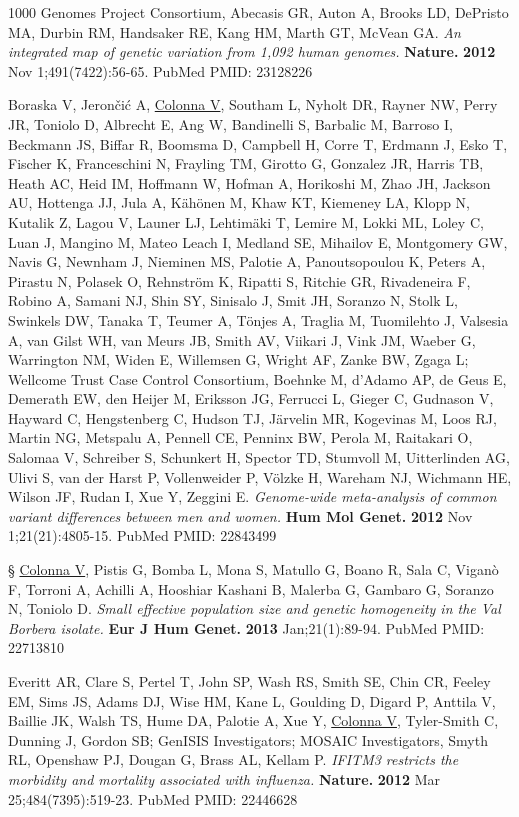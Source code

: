\documentclass[openany]{book}
\begin{document}
\begin{enumerate}
    \item 1000 Genomes Project Consortium, Abecasis GR, Auton A, Brooks LD, DePristo MA, Durbin RM, Handsaker RE, Kang HM, Marth GT, McVean GA. \textit{An integrated map of genetic variation from 1,092 human genomes.}\textbf{ Nature. } \textbf{2012} Nov 1;491(7422):56-65. PubMed PMID: 23128226

    \item Boraska V, Jerončić A, \underline{Colonna V}, Southam L, Nyholt DR, Rayner NW, Perry JR, Toniolo D, Albrecht E, Ang W, Bandinelli S, Barbalic M, Barroso I, Beckmann JS, Biffar R, Boomsma D, Campbell H, Corre T, Erdmann J, Esko T, Fischer K, Franceschini N, Frayling TM, Girotto G, Gonzalez JR, Harris TB, Heath AC, Heid IM, Hoffmann W, Hofman A, Horikoshi M, Zhao JH, Jackson AU, Hottenga JJ, Jula A, Kähönen M, Khaw KT, Kiemeney LA, Klopp N, Kutalik Z, Lagou V, Launer LJ, Lehtimäki T, Lemire M, Lokki ML, Loley C, Luan J, Mangino M, Mateo Leach I, Medland SE, Mihailov E, Montgomery GW, Navis G, Newnham J, Nieminen MS, Palotie A, Panoutsopoulou K, Peters A, Pirastu N, Polasek O, Rehnström K, Ripatti S, Ritchie GR, Rivadeneira F, Robino A, Samani NJ, Shin SY, Sinisalo J, Smit JH, Soranzo N, Stolk L, Swinkels DW, Tanaka T, Teumer A, Tönjes A, Traglia M, Tuomilehto J, Valsesia A, van Gilst WH, van Meurs JB, Smith AV, Viikari J, Vink JM, Waeber G, Warrington NM, Widen E, Willemsen G, Wright AF, Zanke BW, Zgaga L; Wellcome Trust Case Control Consortium, Boehnke M, d'Adamo AP, de Geus E, Demerath EW, den Heijer M, Eriksson JG, Ferrucci L, Gieger C, Gudnason V, Hayward C, Hengstenberg C, Hudson TJ, Järvelin MR, Kogevinas M, Loos RJ, Martin NG, Metspalu A, Pennell CE, Penninx BW, Perola M, Raitakari O, Salomaa V, Schreiber S, Schunkert H, Spector TD, Stumvoll M, Uitterlinden AG, Ulivi S, van der Harst P, Vollenweider P, Völzke H, Wareham NJ, Wichmann HE, Wilson JF, Rudan I, Xue Y, Zeggini E. \textit{Genome-wide meta-analysis of common variant differences between men and women.} \textbf{Hum Mol Genet.} \textbf{2012} Nov 1;21(21):4805-15. PubMed PMID: 22843499

    {\color{blue}\item § \underline{Colonna V}, Pistis G, Bomba L, Mona S, Matullo G, Boano R, Sala C, Viganò F, Torroni A, Achilli A, Hooshiar Kashani B, Malerba G, Gambaro G, Soranzo N, Toniolo D. \textit{Small effective population size and genetic homogeneity in the Val Borbera isolate.} \textbf{Eur J Hum Genet.} \textbf{2013} Jan;21(1):89-94. PubMed PMID: 22713810}


    \item Everitt AR, Clare S, Pertel T, John SP, Wash RS, Smith SE, Chin CR, Feeley EM, Sims JS, Adams DJ, Wise HM, Kane L, Goulding D, Digard P, Anttila V, Baillie JK, Walsh TS, Hume DA, Palotie A, Xue Y, \underline{Colonna V}, Tyler-Smith C, Dunning J, Gordon SB; GenISIS Investigators; MOSAIC Investigators, Smyth RL, Openshaw PJ, Dougan G, Brass AL, Kellam P. \textit{IFITM3 restricts the morbidity and mortality associated with influenza.}\textbf{ Nature. } \textbf{2012} Mar 25;484(7395):519-23. PubMed PMID: 22446628



\end{enumerate}
\end{document}
